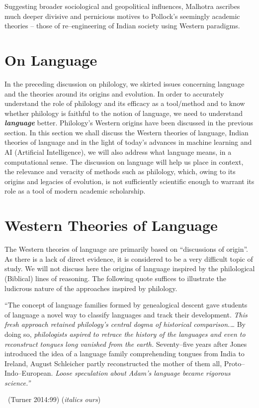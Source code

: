 Suggesting broader sociological and geopolitical influences, Malhotra ascribes much deeper divisive and pernicious motives to Pollock’s seemingly academic theories – those of re–engineering of Indian society using Western paradigms.


\section*{On Language}

In the preceding discussion on philology, we skirted issues concerning language and the theories around its origins and evolution. In order to accurately understand the role of philology and its efficacy as a tool/method and to know whether philology is faithful to the notion of language, we need to understand \textbf{\textit{language}} better. Philology’s Western origins have been discussed in the previous section. In this section we shall discuss the Western theories of language, Indian theories of language and in the light of today’s advances in machine learning and AI (Artificial Intelligence), we will also address what language means, in a computational sense. The discussion on language will help us place in context, the relevance and veracity of methods such as philology, which, owing to its origins and legacies of evolution, is not sufficiently scientific enough to warrant its role as a tool of modern academic scholarship.


\section*{Western Theories of Language}

The Western theories of language are primarily based on “discussions of origin”. As there is a lack of direct evidence, it is considered to be a very difficult topic of study. We will not discuss here the origins of language inspired by the philological (Biblical) lines of reasoning. The following quote suffices to illustrate the ludicrous nature of the approaches inspired by philology.

\begin{myquote}
“The concept of language families formed by genealogical descent gave students of language a novel way to classify languages and track their development. \textit{This fresh approach retained philology’s central dogma of historical comparison.…} By doing so, \textit{philologists aspired to retrace the history of the languages and even to reconstruct tongues long vanished from the earth.} Seventy–five years after Jones introduced the idea of a language family comprehending tongues from India to Ireland, August Schleicher partly reconstructed the mother of them all, Proto–Indo–European. \textit{Loose speculation about Adam’s language became rigorous science.”} 

~\hfill (Turner 2014:99) (\textit{italics ours})
\end{myquote}

